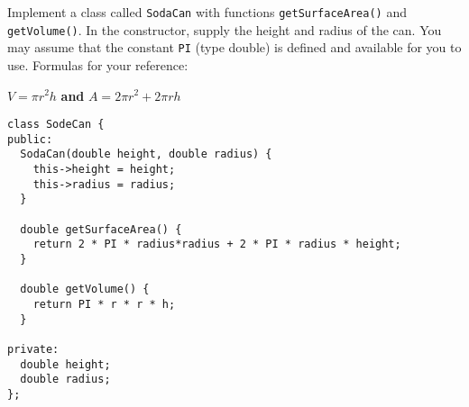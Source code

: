 \documentclass[11pt,answers]{exam}
\begin{document}
\begin{questions}
\newpage
\bonusquestion[15] Implement a class called {\tt SodaCan} with functions {\tt getSurfaceArea()} and {\tt getVolume()}. In the constructor, supply the height and radius of the can. You may assume that the constant {\tt PI} (type double) is defined and available for you to use. Formulas for your reference:
\begin{center} 
  $V = \pi r^2h$ {\bf and} $A = 2 \pi r^2 + 2 \pi r h$
\end{center}

\begin{solution}
\begin{lstlisting}
class SodeCan {
public:
  SodaCan(double height, double radius) {
    this->height = height;
    this->radius = radius;
  }

  double getSurfaceArea() {
    return 2 * PI * radius*radius + 2 * PI * radius * height;	
  }

  double getVolume() {
	return PI * r * r * h;
  }

private: 
  double height;
  double radius;
};
\end{lstlisting}
\end{solution}


\end{questions}
\end{document}

